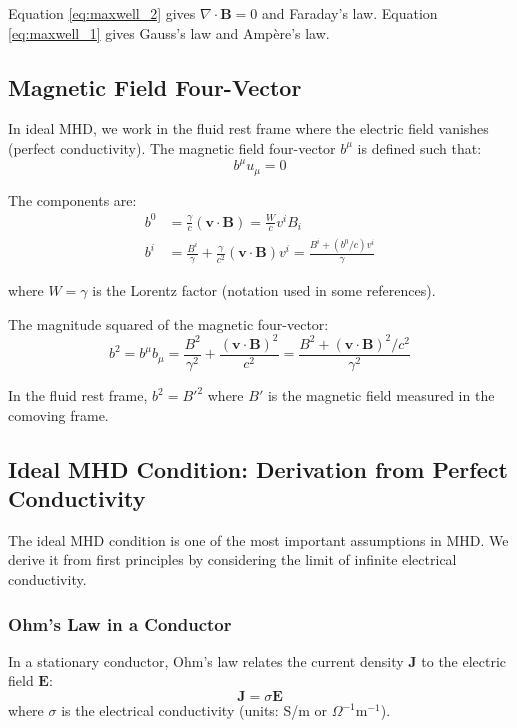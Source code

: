 \documentclass[12pt,a4paper]{article}
\begin{document}
Equation \eqref{eq:maxwell_2} gives $\nabla \cdot \bm{B} = 0$ and Faraday's law.
Equation \eqref{eq:maxwell_1} gives Gauss's law and Amp\`ere's law.

\subsection{Magnetic Field Four-Vector}

In ideal MHD, we work in the fluid rest frame where the electric field vanishes
(perfect conductivity). The magnetic field four-vector $b^\mu$ is defined such that:
\begin{equation}
b^\mu u_\mu = 0
\label{eq:b_orthogonal}
\end{equation}

The components are:
\begin{align}
b^0 &= \frac{\gamma}{c}(\bm{v} \cdot \bm{B}) = \frac{W}{c}v^i B_i \label{eq:b0} \\
b^i &= \frac{B^i}{\gamma} + \frac{\gamma}{c^2}(\bm{v} \cdot \bm{B})v^i = \frac{B^i + (b^0/c)v^i}{\gamma}
\label{eq:bi}
\end{align}

where $W = \gamma$ is the Lorentz factor (notation used in some references).

The magnitude squared of the magnetic four-vector:
\begin{equation}
b^2 = b^\mu b_\mu = \frac{B^2}{\gamma^2} + \frac{(\bm{v} \cdot \bm{B})^2}{c^2}
= \frac{B^2 + (\bm{v} \cdot \bm{B})^2/c^2}{\gamma^2}
\label{eq:b_squared}
\end{equation}

In the fluid rest frame, $b^2 = B'^2$ where $B'$ is the magnetic field measured
in the comoving frame.

\subsection{Ideal MHD Condition: Derivation from Perfect Conductivity}

The ideal MHD condition is one of the most important assumptions in MHD. We derive
it from first principles by considering the limit of infinite electrical conductivity.

\subsubsection{Ohm's Law in a Conductor}

In a stationary conductor, Ohm's law relates the current density $\bm{J}$ to the
electric field $\bm{E}$:
\begin{equation}
\bm{J} = \sigma \bm{E}
\label{eq:ohms_law_stationary}
\end{equation}
where $\sigma$ is the electrical conductivity (units: S/m or $\Omega^{-1}$m$^{-1}$).
\end{document}
